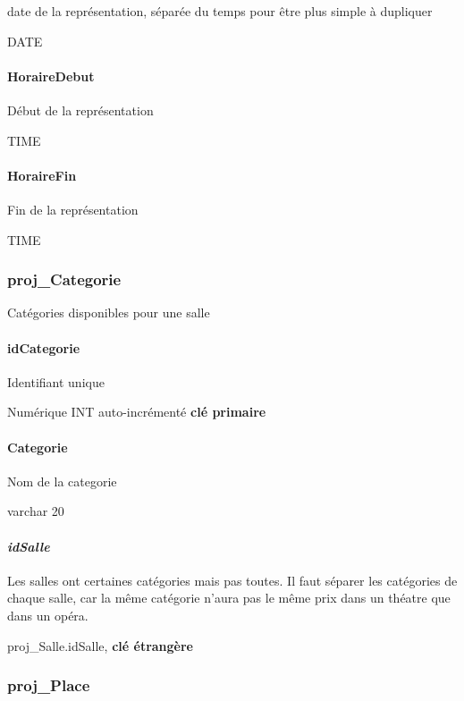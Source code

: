 date de la représentation, séparée du temps pour être plus simple à
dupliquer

DATE

\paragraph{HoraireDebut}\label{horairedebut}

Début de la représentation

TIME

\paragraph{HoraireFin}\label{horairefin}

Fin de la représentation

TIME

\subsubsection{proj\_Categorie}\label{projux5fcategorie}

Catégories disponibles pour une salle

\paragraph{\texorpdfstring{\textbf{idCategorie}}{idCategorie}}\label{idcategorie}

Identifiant unique

Numérique INT auto-incrémenté \textbf{clé primaire}

\paragraph{Categorie}\label{categorie}

Nom de la categorie

varchar 20

\paragraph{\texorpdfstring{\emph{idSalle}}{idSalle}}\label{idsalle-2}

Les salles ont certaines catégories mais pas toutes. Il faut séparer les
catégories de chaque salle, car la même catégorie n'aura pas le même
prix dans un théatre que dans un opéra.

proj\_Salle.idSalle, \textbf{clé étrangère}

\subsubsection{proj\_Place}\label{projux5fplace}

